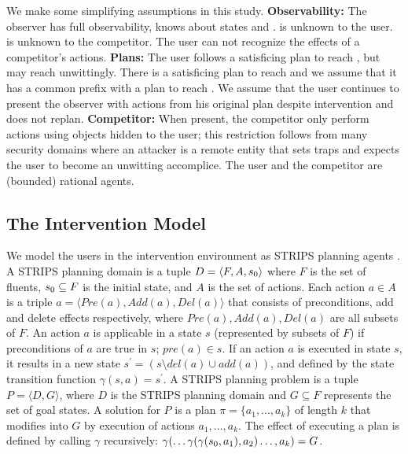 We make some simplifying assumptions in this study.
\textbf{Observability:} 
The observer has full observability, knows about states \desired and \undesired.
\undesired is unknown to the user. \desired is unknown to the competitor.
The user can not recognize the effects of a competitor's actions. 
\textbf{Plans:} 
The user follows a satisficing plan to reach \desired, but may reach \undesired unwittingly. 
There is a satisficing plan to reach \dandu and we assume that it has a common prefix with a plan to reach \desired. We assume that the user continues to present the observer with actions from his original plan despite intervention and does not replan. 
\textbf{Competitor:}
When present, the competitor only perform actions using objects hidden to the user; this restriction follows from many security domains where an attacker is a remote entity that sets traps and expects the user to become an unwitting accomplice.
The user and the competitor are (bounded) rational agents.

\subsection{The Intervention Model}
\label{sec:models}
We model the users in the intervention environment as STRIPS planning agents \cite{fikes1971strips}.
A STRIPS planning domain is a tuple $D=\langle F, A, s_0\rangle$
where $F$ is the set of fluents, $s_0\subseteq F$ is the initial state, and $A$ is the set of actions.
Each action $a \in A$ is a triple $a=\langle Pre(a), Add(a), Del(a)\rangle$ that consists of preconditions, add and delete effects respectively, where $Pre(a), Add(a), Del(a)$ are all subsets of $F$. 
An action $a$ is applicable in a state $s$ (represented by subsets of $F$) if preconditions of $a$ are true in $s$; $pre(a) \in s$. 
If an action $a$ is executed in state $s$, it results in a new state $s^{\prime} = (s \setminus del(a) \cup add(a))$, and defined by the state transition function $\gamma(s,a)=s^\prime$.
A STRIPS planning problem  is a tuple $ P = \langle D, G \rangle$, where $D$ is the STRIPS planning domain and $G  \subseteq F$ represents the set of goal states. 
A solution for $P$ is a plan $\pi = \{a_1, \dots ,a_k\}$ of length $k$ that modifies \initialState into $G$ by execution of actions $a_1, \dots, a_k$. The effect of executing a plan is defined by calling $\gamma$ recursively: $\gamma(\ldots\gamma(\gamma(s_0,a_1),a_2)\ldots , a_k) = G$.

